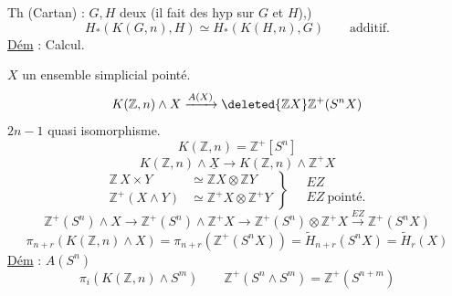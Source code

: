 
Th (Cartan) : $G,H$ deux   (il fait des hyp sur $G$ et $H$),)
\[
H_*(K(G,n),H)\simeq H_*(K(H,n),G)\qquad\text{additif.}
\]
\uline{Dém} : Calcul.

$X$ un ensemble simplicial pointé.
\[
K(\mathbb Z,n)\wedge X\xrightarrow{A(X)}\deleted{\mathbb Z X}\mathbb Z^{+}(S^nX)
\]
$2n-1$ quasi isomorphisme.
\[
K(\mathbb Z,n)=\mathbb Z^{+}[S^n]
\]
\[
K(\mathbb Z,n)\wedge\underline X\longrightarrow K(\mathbb Z,n)\wedge\mathbb Z^+X
\]
\[
\left.\begin{aligned}
\mathbb Z\,X\times Y&\simeq\mathbb ZX\otimes\mathbb ZY\\
\mathbb Z^+(X\wedge Y)&\simeq\mathbb Z^+X\otimes\mathbb Z^+Y
\end{aligned}\right\}\quad
\begin{array}{l}EZ\\ EZ\ \text{pointé.}\end{array}
\]
\[
\mathbb Z^+(S^n)\wedge X\longrightarrow\mathbb Z^+(S^n)\wedge\mathbb Z^+X
\longrightarrow\mathbb Z^+(S^n)\otimes\mathbb Z^+X\xrightarrow{EZ}\mathbb Z^+(S^nX)
\]
\[
\pi_{n+r}(K(\mathbb Z,n)\wedge X)=\pi_{n+r}(\mathbb Z^+(S^nX))
=\widetilde H_{n+r}(S^nX)=\widetilde H_r(X)
\]
\uline{Dém} : $A(S^n)$
\[
\pi_i(K(\mathbb Z,n)\wedge S^m)\qquad
\mathbb Z^+(S^n\wedge S^m)=\mathbb Z^+(S^{n+m})
\]

